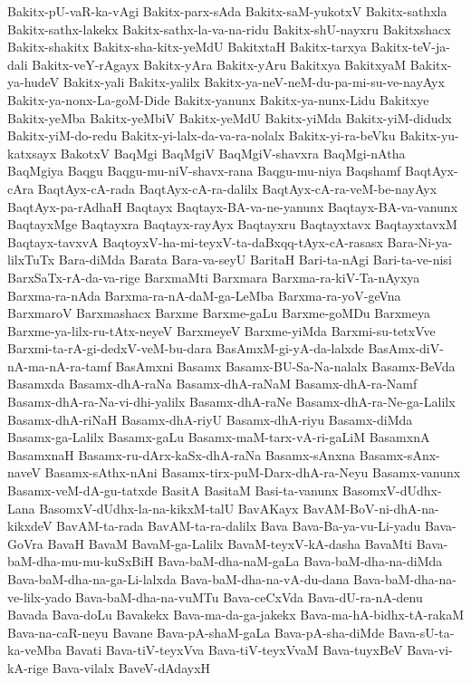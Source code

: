 {Bakitx-pU-vaR-ka-vAgi
Bakitx-parx-sAda
Bakitx-saM-yukotxV
Bakitx-sathxla
Bakitx-sathx-lakekx
Bakitx-sathx-la-va-na-ridu
Bakitx-shU-nayxru
Bakitxshacx
Bakitx-shakitx
Bakitx-sha-kitx-yeMdU
BakitxtaH
Bakitx-tarxya
Bakitx-teV-ja-dali
Bakitx-veY-rAgayx
Bakitx-yAra
Bakitx-yAru
Bakitxya
BakitxyaM
Bakitx-ya-hudeV
Bakitx-yali
Bakitx-yalilx
Bakitx-ya-neV-neM-du-pa-mi-su-ve-nayAyx
Bakitx-ya-nonx-La-goM-Dide
Bakitx-yanunx
Bakitx-ya-nunx-Lidu
Bakitxye
Bakitx-yeMba
Bakitx-yeMbiV
Bakitx-yeMdU
Bakitx-yiMda
Bakitx-yiM-didudx
Bakitx-yiM-do-redu
Bakitx-yi-lalx-da-va-ra-nolalx
Bakitx-yi-ra-beVku
Bakitx-yu-katxsayx
BakotxV
BaqMgi
BaqMgiV
BaqMgiV-shavxra
BaqMgi-nAtha
BaqMgiya
Baqgu
Baqgu-mu-niV-shavx-rana
Baqgu-mu-niya
Baqshamf
BaqtAyx-cAra
BaqtAyx-cA-rada
BaqtAyx-cA-ra-dalilx
BaqtAyx-cA-ra-veM-be-nayAyx
BaqtAyx-pa-rAdhaH
Baqtayx
Baqtayx-BA-va-ne-yanunx
Baqtayx-BA-va-vanunx
BaqtayxMge
Baqtayxra
Baqtayx-rayAyx
Baqtayxru
Baqtayxtavx
BaqtayxtavxM
Baqtayx-tavxvA
BaqtoyxV-ha-mi-teyxV-ta-daBxqq-tAyx-cA-rasasx
Bara-Ni-ya-lilxTuTx
Bara-diMda
Barata
Bara-va-seyU
BaritaH
Bari-ta-nAgi
Bari-ta-ve-nisi
BarxSaTx-rA-da-va-rige
BarxmaMti
Barxmara
Barxma-ra-kiV-Ta-nAyxya
Barxma-ra-nAda
Barxma-ra-nA-daM-ga-LeMba
Barxma-ra-yoV-geVna
BarxmaroV
Barxmashacx
Barxme
Barxme-gaLu
Barxme-goMDu
Barxmeya
Barxme-ya-lilx-ru-tAtx-neyeV
BarxmeyeV
Barxme-yiMda
Barxmi-su-tetxVve
Barxmi-ta-rA-gi-dedxV-veM-bu-dara
BasAmxM-gi-yA-da-lalxde
BasAmx-diV-nA-ma-nA-ra-tamf
BasAmxni
Basamx
Basamx-BU-Sa-Na-nalalx
Basamx-BeVda
Basamxda
Basamx-dhA-raNa
Basamx-dhA-raNaM
Basamx-dhA-ra-Namf
Basamx-dhA-ra-Na-vi-dhi-yalilx
Basamx-dhA-raNe
Basamx-dhA-ra-Ne-ga-Lalilx
Basamx-dhA-riNaH
Basamx-dhA-riyU
Basamx-dhA-riyu
Basamx-diMda
Basamx-ga-Lalilx
Basamx-gaLu
Basamx-maM-tarx-vA-ri-gaLiM
BasamxnA
BasamxnaH
Basamx-ru-dArx-kaSx-dhA-raNa
Basamx-sAnxna
Basamx-sAnx-naveV
Basamx-sAthx-nAni
Basamx-tirx-puM-Darx-dhA-ra-Neyu
Basamx-vanunx
Basamx-veM-dA-gu-tatxde
BasitA
BasitaM
Basi-ta-vanunx
BasomxV-dUdhx-Lana
BasomxV-dUdhx-la-na-kikxM-talU
BavAKayx
BavAM-BoV-ni-dhA-na-kikxdeV
BavAM-ta-rada
BavAM-ta-ra-dalilx
Bava
Bava-Ba-ya-vu-Li-yadu
Bava-GoVra
BavaH
BavaM
BavaM-ga-Lalilx
BavaM-teyxV-kA-dasha
BavaMti
Bava-baM-dha-mu-mu-kuSxBiH
Bava-baM-dha-naM-gaLa
Bava-baM-dha-na-diMda
Bava-baM-dha-na-ga-Li-lalxda
Bava-baM-dha-na-vA-du-dana
Bava-baM-dha-na-ve-lilx-yado
Bava-baM-dha-na-vuMTu
Bava-ceCxVda
Bava-dU-ra-nA-denu
Bavada
Bava-doLu
Bavakekx
Bava-ma-da-ga-jakekx
Bava-ma-hA-bidhx-tA-rakaM
Bava-na-caR-neyu
Bavane
Bava-pA-shaM-gaLa
Bava-pA-sha-diMde
Bava-sU-ta-ka-veMba
Bavati
Bava-tiV-teyxVva
Bava-tiV-teyxVvaM
Bava-tuyxBeV
Bava-vi-kA-rige
Bava-vilalx
BaveV-dAdayxH
}
